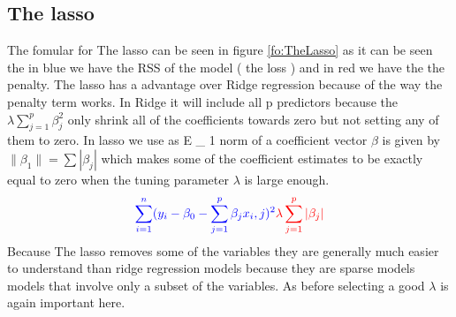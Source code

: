 \subsection{The lasso}
The fomular for The lasso can be seen in figure \ref{fo:TheLasso} as it can be seen the in blue we have the RSS of the model ( the loss ) and in red we have the the penalty. The lasso has a advantage over Ridge regression because of the way the penalty term works. In Ridge it will include all p predictors because the $\lambda \sum_{j=1}^{p} \beta^2_j$ only shrink all of the coefficients towards zero but not setting any of them to zero. In lasso we use as E \_ 1 norm of a coefficient vector $\beta$ is given by $ \lVert \beta_1 \rVert = \sum | \beta_j |$ which makes some of the coefficient estimates to be exactly equal to zero when the tuning parameter $\lambda$ is large enough.
\begin{align}\label{fo:TheLasso}
\color{blue} \sum_{i=1}^{n} ( y_i - \beta_0 - \sum_{j=1}^{p} \beta_j x_i,j )^2  \color{red} \lambda \sum_{j=1}^{p} |\beta_j|
\end{align}
Because The lasso removes some of the variables they are generally much easier to understand than ridge regression models because they are sparse models
models that involve only a subset of the variables. As before selecting a good $\lambda$ is again important here.




